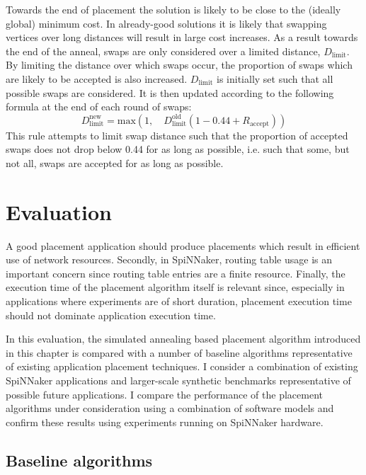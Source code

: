 				Towards the end of placement the solution is likely to be close to the
				(ideally global) minimum cost. In already-good solutions it is likely
				that swapping vertices over long distances will result in large cost
				increases. As a result towards the end of the anneal, swaps are only
				considered over a limited distance, $D_\textrm{limit}$. By limiting the
				distance over which swaps occur, the proportion of swaps which are
				likely to be accepted is also increased. $D_\textrm{limit}$ is
				initially set such that all possible swaps are considered. It is then
				updated according to the following formula at the end of each round of
				swaps:
				\[
					D_\textrm{limit}^\textrm{new} =
						\textrm{max}(1,\quad D_\textrm{limit}^\textrm{old}(1-0.44 + R_\textrm{accept}))
				\]
				This rule attempts to limit swap distance such that the proportion of
				accepted swaps does not drop below 0.44 for as long as possible, i.e.
				such that some, but not all, swaps are accepted for as long as
				possible.
	
	\section{Evaluation}
		
		\label{sec:placement-results}
		
		A good placement application should produce placements which result in
		efficient use of network resources. Secondly, in SpiNNaker, routing table
		usage is an important concern since routing table entries are a finite
		resource. Finally, the execution time of the placement algorithm itself is
		relevant since, especially in applications where experiments are of short
		duration, placement execution time should not dominate application
		execution time.
		
		In this evaluation, the simulated annealing based placement algorithm
		introduced in this chapter is compared with a number of baseline algorithms
		representative of existing application placement techniques. I consider a
		combination of existing SpiNNaker applications and larger-scale synthetic
		benchmarks representative of possible future applications. I compare the
		performance of the placement algorithms under consideration using a
		combination of software models and confirm these results using experiments
		running on SpiNNaker hardware.
		
		\subsection{Baseline algorithms}
			
